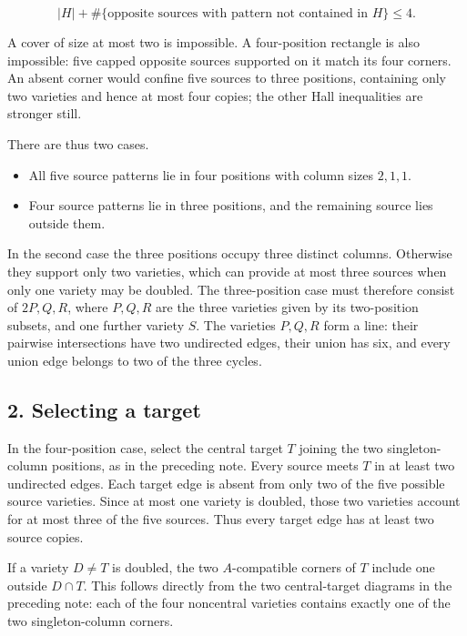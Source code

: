 \documentclass[
  10pt,
]{article}
\providecommand{\tightlist}{%
  \setlength{\itemsep}{0pt}\setlength{\parskip}{0pt}}
\begin{document}
\[
|H|+\#\{\text{opposite sources with pattern not contained in }H\}\le4.
\]

A cover of size at most two is impossible. A four-position rectangle is
also impossible: five capped opposite sources supported on it match its
four corners. An absent corner would confine five sources to three
positions, containing only two varieties and hence at most four copies;
the other Hall inequalities are stronger still.

There are thus two cases.

\begin{itemize}
\tightlist
\item
  All five source patterns lie in four positions with column sizes
  \(2,1,1\).
\item
  Four source patterns lie in three positions, and the remaining source
  lies outside them.
\end{itemize}

In the second case the three positions occupy three distinct columns.
Otherwise they support only two varieties, which can provide at most
three sources when only one variety may be doubled. The three-position
case must therefore consist of \(2P,Q,R\), where \(P,Q,R\) are the three
varieties given by its two-position subsets, and one further variety
\(S\). The varieties \(P,Q,R\) form a line: their pairwise intersections
have two undirected edges, their union has six, and every union edge
belongs to two of the three cycles.

\hypertarget{selecting-a-target}{%
\subsection*{2. Selecting a target}\label{selecting-a-target}}

In the four-position case, select the central target \(T\) joining the
two singleton-column positions, as in the preceding note. Every source
meets \(T\) in at least two undirected edges. Each target edge is absent
from only two of the five possible source varieties. Since at most one
variety is doubled, those two varieties account for at most three of the
five sources. Thus every target edge has at least two source copies.

If a variety \(D\ne T\) is doubled, the two \(A\)-compatible corners of
\(T\) include one outside \(D\cap T\). This follows directly from the
two central-target diagrams in the preceding note: each of the four
noncentral varieties contains exactly one of the two singleton-column
corners.
\end{document}
